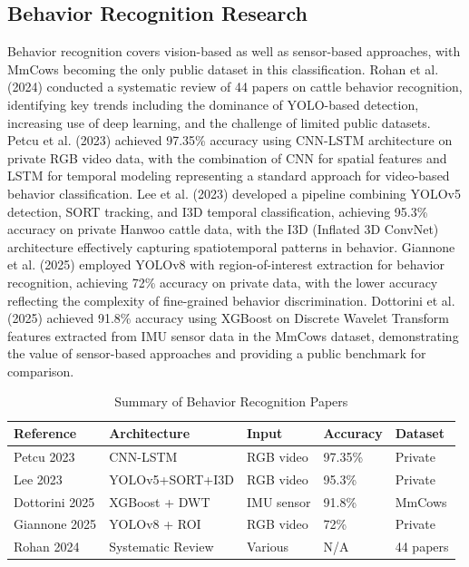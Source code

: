\subsection{Behavior Recognition Research}

Behavior recognition covers vision-based as well as sensor-based approaches, with MmCows becoming the only public dataset in this classification. Rohan et al. (2024) \cite{rohan2024review} conducted a systematic review of 44 papers on cattle behavior recognition, identifying key trends including the dominance of YOLO-based detection, increasing use of deep learning, and the challenge of limited public datasets. Petcu et al. (2023) \cite{petcu2023cnnlstm} achieved 97.35\% accuracy using CNN-LSTM architecture on private RGB video data, with the combination of CNN for spatial features and LSTM for temporal modeling representing a standard approach for video-based behavior classification. Lee et al. (2023) \cite{lee2023hanwoo} developed a pipeline combining YOLOv5 detection, SORT tracking, and I3D temporal classification, achieving 95.3\% accuracy on private Hanwoo cattle data, with the I3D (Inflated 3D ConvNet) architecture effectively capturing spatiotemporal patterns in behavior. Giannone et al. (2025) \cite{giannone2025behavior} employed YOLOv8 with region-of-interest extraction for behavior recognition, achieving 72\% accuracy on private data, with the lower accuracy reflecting the complexity of fine-grained behavior discrimination. Dottorini et al. (2025) \cite{dottorini2025imu} achieved 91.8\% accuracy using XGBoost on Discrete Wavelet Transform features extracted from IMU sensor data in the MmCows dataset, demonstrating the value of sensor-based approaches and providing a public benchmark for comparison.

\begin{table}[h]
\centering
\caption{Summary of Behavior Recognition Papers}
\label{tab:behavior_papers}
\begin{tabular}{|p{2.8cm}|p{4cm}|p{2.2cm}|p{2cm}|p{1.9cm}|}
\hline
\textbf{Reference} & \textbf{Architecture} & \textbf{Input} & \textbf{Accuracy} & \textbf{Dataset} \\
\hline
Petcu 2023 & CNN-LSTM & RGB video & 97.35\% & Private \\
\hline
Lee 2023 & YOLOv5+SORT+I3D & RGB video & 95.3\% & Private \\
\hline
Dottorini 2025 & XGBoost + DWT & IMU sensor & 91.8\% & MmCows \\
\hline
Giannone 2025 & YOLOv8 + ROI & RGB video & 72\% & Private \\
\hline
Rohan 2024 & Systematic Review & Various & N/A & 44 papers \\
\hline
\end{tabular}
\end{table}

